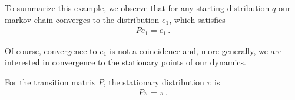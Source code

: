 To summarize this example, we observe that for any starting distribution $q$ our markov chain converges to the distribution $e_1$, which satisfies
\begin{align}
    Pe_1 = e_1\,.
\end{align}

Of course, convergence to $e_1$ is not a coincidence and, more generally, we are interested in convergence to the stationary points of our dynamics.
\begin{mybox}
\begin{definition}
    For the transition matrix $P$, the stationary distribution $\pi$ is
    \begin{align}
        P\pi = \pi\,.
    \end{align}
\end{definition}    
\end{mybox}

